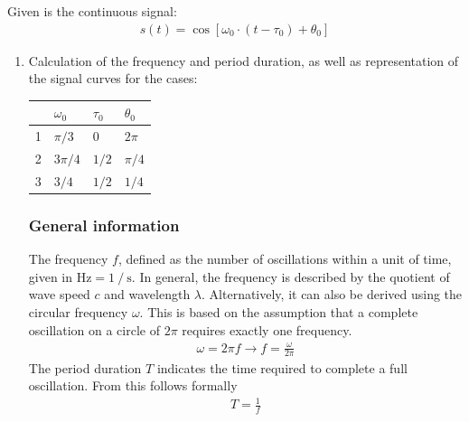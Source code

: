 Given is the continuous signal:
{
	\setlength{\abovedisplayskip}{0pt}
	\setlength{\belowdisplayskip}{6pt}
	\setlength{\abovedisplayshortskip}{0pt}
	\setlength{\belowdisplayshortskip}{0pt}
	\begin{align*}
		s(t) = \cos\left[{\omega_0\cdot\left(t-\tau_0\right)+\theta_0}\right]
	\end{align*}
}
\renewcommand{\labelenumi}{\alph{enumi})}

\newenvironment{nscenter}
{\parskip=0pt\par\nopagebreak\centering}
{\par\noindent\ignorespacesafterend}
\begin{enumerate}
	\item
		Calculation of the frequency and period duration, as well as representation of the signal curves for the cases:
		\begin{nscenter}
			\begin{tabular}{c|lll}
				& $\omega_0$ & $\tau_0$ & $\theta_0$ \\
				\hline
				1 & $\pi/3$ & $0$ & $2\pi$ \\
				2 & $3\pi/4$ & $1/2$ & $\pi/{4}$ \\
				3 & $3/4$ & $1/2$ & $1/4$ \\
			\end{tabular}
		\end{nscenter}
		
		\subsubsection{General information}
		The frequency $f$, defined as the number of oscillations within a unit of time, given in $\si{\Hz} = 1\fracslash\si{\s}$. In general, the frequency is described by the quotient of wave speed $c$ and wavelength $\lambda$. Alternatively, it can also be derived using the circular frequency $\omega$. This is based on the assumption that a complete oscillation on a circle of $2\pi$ requires exactly one frequency.
		{
			\setlength{\abovedisplayskip}{0pt}
			\setlength{\belowdisplayskip}{6pt}
			\setlength{\abovedisplayshortskip}{0pt}
			\setlength{\belowdisplayshortskip}{0pt}
			\begin{align*}
				\omega = 2\pi{f} \rightarrow f = \frac{\omega}{2\pi}
			\end{align*}
		}%
		The period duration $T$ indicates the time required to complete a full oscillation. From this follows formally
		{
			\setlength{\abovedisplayskip}{0pt}
			\setlength{\belowdisplayskip}{6pt}
			\setlength{\abovedisplayshortskip}{0pt}
			\setlength{\belowdisplayshortskip}{0pt}
			\begin{align*}
				T = \frac{1}{f}
			\end{align*}
		}
		

\end{enumerate}
